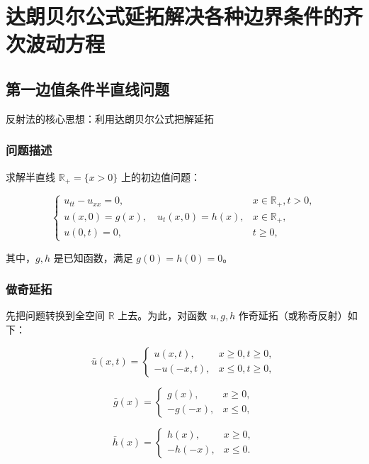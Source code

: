 \documentclass[12pt,a4paper]{article}
\numberwithin{subsection}{section}   %
\numberwithin{subsubsection}{subsection}
\theoremstyle{plain}
\theoremstyle{definition}
\theoremstyle{remark}
\theoremstyle{remark}
\begin{document}
	
	\newpage
	
	\section{达朗贝尔公式延拓解决各种边界条件的齐次波动方程}
	\subsection{第一边值条件半直线问题}
	反射法的核心思想：利用达朗贝尔公式把解延拓
	
	\subsubsection{问题描述}
	求解半直线 \(\mathbb{R}_+ = \{x > 0\}\) 上的初边值问题：
	
	\begin{equation}
		\begin{cases}
			u_{tt} - u_{xx} = 0, & x \in \mathbb{R}_+, t > 0, \\
			u(x, 0) = g(x), \quad u_t(x, 0) = h(x), & x \in \mathbb{R}_+, \\
			u(0, t) = 0, & t \geq 0,
		\end{cases}
	\end{equation}
	
	其中，\(g, h\) 是已知函数，满足 \(g(0) = h(0) = 0\)。
	
	\subsubsection{做奇延拓}
先把问题转换到全空间 \(\mathbb{R}\) 上去。为此，对函数 \(u, g, h\) 作奇延拓（或称奇反射）如下：
	
	\begin{equation}
		\bar{u}(x, t) = \begin{cases}
			u(x, t), & x \geq 0, t \geq 0, \\
			-u(-x, t), & x \leq 0, t \geq 0,
		\end{cases}
	\end{equation}
	
	\begin{equation}
		\bar{g}(x) = \begin{cases}
			g(x), & x \geq 0, \\
			-g(-x), & x \leq 0,
		\end{cases}
	\end{equation}
	
	\begin{equation}
		\bar{h}(x) = \begin{cases}
			h(x), & x \geq 0, \\
			-h(-x), & x \leq 0.
		\end{cases}
	\end{equation}
	
\end{document}
